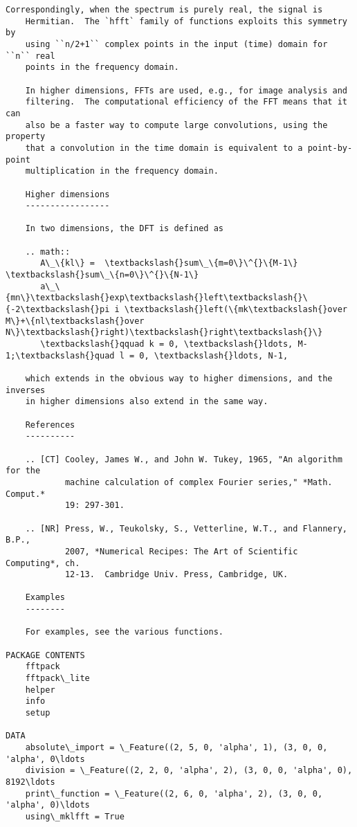 \documentclass{article}
\begin{document}
\begin{Verbatim}[commandchars=\\\{\}]
    Correspondingly, when the spectrum is purely real, the signal is
    Hermitian.  The `hfft` family of functions exploits this symmetry by
    using ``n/2+1`` complex points in the input (time) domain for ``n`` real
    points in the frequency domain.
    
    In higher dimensions, FFTs are used, e.g., for image analysis and
    filtering.  The computational efficiency of the FFT means that it can
    also be a faster way to compute large convolutions, using the property
    that a convolution in the time domain is equivalent to a point-by-point
    multiplication in the frequency domain.
    
    Higher dimensions
    -----------------
    
    In two dimensions, the DFT is defined as
    
    .. math::
       A\_\{kl\} =  \textbackslash{}sum\_\{m=0\}\^{}\{M-1\} \textbackslash{}sum\_\{n=0\}\^{}\{N-1\}
       a\_\{mn\}\textbackslash{}exp\textbackslash{}left\textbackslash{}\{-2\textbackslash{}pi i \textbackslash{}left(\{mk\textbackslash{}over M\}+\{nl\textbackslash{}over N\}\textbackslash{}right)\textbackslash{}right\textbackslash{}\}
       \textbackslash{}qquad k = 0, \textbackslash{}ldots, M-1;\textbackslash{}quad l = 0, \textbackslash{}ldots, N-1,
    
    which extends in the obvious way to higher dimensions, and the inverses
    in higher dimensions also extend in the same way.
    
    References
    ----------
    
    .. [CT] Cooley, James W., and John W. Tukey, 1965, "An algorithm for the
            machine calculation of complex Fourier series," *Math. Comput.*
            19: 297-301.
    
    .. [NR] Press, W., Teukolsky, S., Vetterline, W.T., and Flannery, B.P.,
            2007, *Numerical Recipes: The Art of Scientific Computing*, ch.
            12-13.  Cambridge Univ. Press, Cambridge, UK.
    
    Examples
    --------
    
    For examples, see the various functions.

PACKAGE CONTENTS
    fftpack
    fftpack\_lite
    helper
    info
    setup

DATA
    absolute\_import = \_Feature((2, 5, 0, 'alpha', 1), (3, 0, 0, 'alpha', 0\ldots
    division = \_Feature((2, 2, 0, 'alpha', 2), (3, 0, 0, 'alpha', 0), 8192\ldots
    print\_function = \_Feature((2, 6, 0, 'alpha', 2), (3, 0, 0, 'alpha', 0)\ldots
    using\_mklfft = True
    \end{Verbatim}
\end{document}

